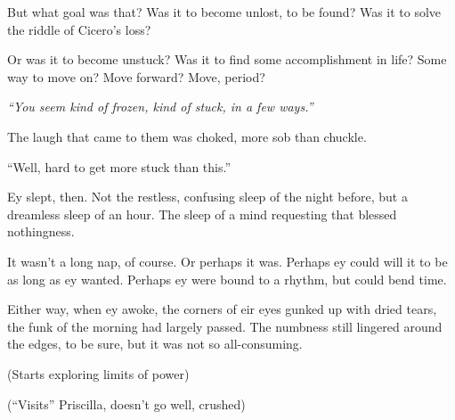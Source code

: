 But what goal was that? Was it to become unlost, to be found? Was it to solve the riddle of Cicero's loss?

Or was it to become unstuck? Was it to find some accomplishment in life? Some way to move on? Move forward? Move, period?

\emph{``You seem kind of frozen, kind of stuck, in a few ways.''}

The laugh that came to them was choked, more sob than chuckle.

``Well, hard to get more stuck than this.''

Ey slept, then. Not the restless, confusing sleep of the night before, but a dreamless sleep of an hour. The sleep of a mind requesting that blessed nothingness.

It wasn't a long nap, of course. Or perhaps it was. Perhaps ey could will it to be as long as ey wanted. Perhaps ey were bound to a rhythm, but could bend time.

Either way, when ey awoke, the corners of eir eyes gunked up with dried tears, the funk of the morning had largely passed. The numbness still lingered around the edges, to be sure, but it was not so all-consuming.

(Starts exploring limits of power)

(``Visits'' Priscilla, doesn't go well, crushed)
